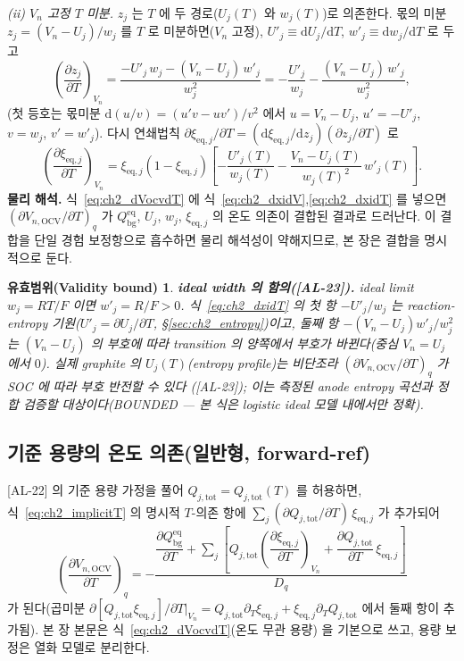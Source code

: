 \documentclass[11pt,a4paper]{article}
\newtheorem*{boundbox}{유효범위(Validity bound)}
\newcommand{\dd}{\mathrm{d}}
\newcommand{\eq}{\mathrm{eq}}
\newcommand{\bg}{\mathrm{bg}}
\newcommand{\OCV}{\mathrm{OCV}}
\newcommand{\tot}{\mathrm{tot}}
\newcommand{\AL}[1]{\textsf{[AL-#1]}}
\begin{document}
\emph{(ii) $V_n$ 고정 $T$ 미분.} $z_j$ 는 $T$ 에 두 경로($U_j(T)$ 와 $w_j(T)$)로 의존한다. 몫의 미분
$z_j=(V_n-U_j)/w_j$ 를 $T$ 로 미분하면($V_n$ 고정), $U'_j\equiv\dd U_j/\dd T$, $w'_j\equiv\dd w_j/\dd T$ 로
두고
\begin{equation}
\left(\frac{\partial z_j}{\partial T}\right)_{V_n}=\frac{-U'_j\,w_j-(V_n-U_j)\,w'_j}{w_j^2}
=-\frac{U'_j}{w_j}-\frac{(V_n-U_j)\,w'_j}{w_j^2},
\label{eq:ch2_dzdT}
\end{equation}
(첫 등호는 몫미분 $\dd(u/v)=(u'v-uv')/v^2$ 에서 $u=V_n-U_j$, $u'=-U'_j$, $v=w_j$, $v'=w'_j$). 다시 연쇄법칙
$\partial\xi_{\eq,j}/\partial T=(\dd\xi_{\eq,j}/\dd z_j)(\partial z_j/\partial T)$ 로
\begin{equation}
\left(\frac{\partial\xi_{\eq,j}}{\partial T}\right)_{V_n}
=\xi_{\eq,j}(1-\xi_{\eq,j})\left[-\frac{U'_j(T)}{w_j(T)}-\frac{V_n-U_j(T)}{w_j(T)^2}\,w'_j(T)\right].
\label{eq:ch2_dxidT}
\end{equation}
\textbf{물리 해석.} 식~\eqref{eq:ch2_dVocvdT} 에 식~\eqref{eq:ch2_dxidV},\eqref{eq:ch2_dxidT} 를 넣으면
$(\partial V_{n,\OCV}/\partial T)_q$ 가 $Q_\bg^{\eq}$, $U_j$, $w_j$, $\xi_{\eq,j}$ 의 온도 의존이 결합된 결과로
드러난다. 이 결합을 단일 경험 보정항으로 흡수하면 물리 해석성이 약해지므로, 본 장은 결합을 명시적으로 둔다.
\begin{boundbox}
\textbf{ideal width 의 함의(\AL{23}).} ideal limit $w_j=RT/F$ 이면 $w'_j=R/F>0$. 식~\eqref{eq:ch2_dxidT} 의
첫 항 $-U'_j/w_j$ 는 reaction-entropy 기원($U'_j=\partial U_j/\partial T$, \S\ref{sec:ch2_entropy})이고, 둘째
항 $-(V_n-U_j)w'_j/w_j^2$ 는 $(V_n-U_j)$ 의 부호에 따라 transition 의 양쪽에서 부호가 바뀐다(중심 $V_n=U_j$
에서 $0$). 실제 graphite 의 $U_j(T)$(entropy profile)는 비단조라 $(\partial V_{n,\OCV}/\partial T)_q$ 가
SOC 에 따라 부호 반전할 수 있다 \cite{reynier2004,thomasnewman2003}(\AL{23}); 이는 측정된 anode entropy
곡선과 정합 검증할 대상이다(BOUNDED — 본 식은 logistic ideal 모델 내에서만 정확).
\end{boundbox}

\subsection{기준 용량의 온도 의존(일반형, forward-ref)}\label{sec:ch2_ocvT_general}
\AL{22} 의 기준 용량 가정을 풀어 $Q_{j,\tot}=Q_{j,\tot}(T)$ 를 허용하면, 식~\eqref{eq:ch2_implicitT} 의 명시적
$T$-의존 항에 $\sum_j(\partial Q_{j,\tot}/\partial T)\,\xi_{\eq,j}$ 가 추가되어
\begin{equation}
\left(\frac{\partial V_{n,\OCV}}{\partial T}\right)_q
=-\frac{\dfrac{\partial Q_\bg^{\eq}}{\partial T}+\displaystyle\sum_j\!\left[Q_{j,\tot}\!\left(\dfrac{\partial\xi_{\eq,j}}{\partial T}\right)_{V_n}\!\!+\dfrac{\partial Q_{j,\tot}}{\partial T}\,\xi_{\eq,j}\right]}{D_q}
\label{eq:ch2_dVocvdT_gen}
\end{equation}
가 된다(곱미분 $\partial[Q_{j,\tot}\xi_{\eq,j}]/\partial T|_{V_n}=Q_{j,\tot}\partial_T\xi_{\eq,j}+\xi_{\eq,j}\partial_T Q_{j,\tot}$
에서 둘째 항이 추가됨). 본 장 본문은 식~\eqref{eq:ch2_dVocvdT}(온도 무관 용량) 을 기본으로 쓰고, 용량 보정은
열화 모델로 분리한다.
\end{document}
